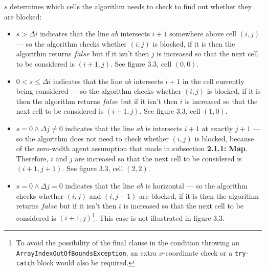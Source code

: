 \documentclass[12pt,notitlepage]{report}
\begin{document}
\noindent
$s$ determines which cells the algorithm needs to check to find out whether they are blocked:
\begin{itemize}
\item $s > \Delta i$ indicates that the line $ab$ intersects $i+1$ somewhere above cell $(i,j)$ --- so the algorithm checks whether $(i,j)$ is blocked, if it is then the algorithm returns $false$ but if it isn't then $j$ is increased so that the next cell to be considered is $(i+1,j)$. See figure 3.3, cell $(0,0)$.
\item $0 < s \leq \Delta i$ indicates that the line $ab$ intersects $i+1$ in the cell currently being considered --- so the algorithm checks whether $(i,j)$ is blocked, if it is then the algorithm returns $false$ but if it isn't then $i$ is increased so that the next cell to be considered is $(i+1,j)$. See figure 3.3, cell $(1,0)$.
\item $s = 0 \land \Delta j \neq 0$ indicates that the line $ab$ is intersects $i+1$ at exactly $j+1$ --- so the algorithm does not need to check whether $(i,j)$ is blocked, because of the zero-width agent assumption that made in subsection {\bfseries 2.1.1: Map}. Therefore, $i$ and $j$ are increased so that the next cell to be considered is $(i+1,j+1)$. See figure 3.3, cell $(2,2)$.
\item $s = 0 \land \Delta j = 0$ indicates that the line $ab$ is horizontal --- so the algorithm checks whether $(i,j)$ and $(i,j-1)$ are blocked, if it is then the algorithm returns $false$ but if it isn't then $i$ is increased so that the next cell to be considered is $(i+1,j)$\footnote{To avoid the possibility of the final clause in the condition throwing an {\tt ArrayIndexOutOfBoundsException}, an extra $x$-coordinate check or a {\tt try-catch} block would also be required.}. This case is not illustrated in figure 3.3.
\end{itemize}
\end{document}
